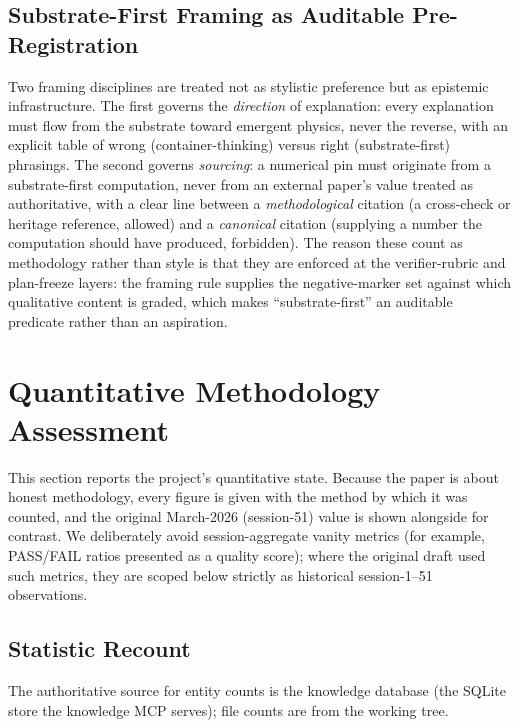 \documentclass[12pt,a4paper]{article}
\begin{document}
\subsection{Substrate-First Framing as Auditable Pre-Registration}
\label{sec:floor-framing}

Two framing disciplines are treated not as stylistic preference but as epistemic infrastructure. The first governs the \emph{direction} of explanation: every explanation must flow from the substrate toward emergent physics, never the reverse, with an explicit table of wrong (container-thinking) versus right (substrate-first) phrasings. The second governs \emph{sourcing}: a numerical pin must originate from a substrate-first computation, never from an external paper's value treated as authoritative, with a clear line between a \emph{methodological} citation (a cross-check or heritage reference, allowed) and a \emph{canonical} citation (supplying a number the computation should have produced, forbidden). The reason these count as methodology rather than style is that they are enforced at the verifier-rubric and plan-freeze layers: the framing rule supplies the negative-marker set against which qualitative content is graded, which makes ``substrate-first'' an auditable predicate rather than an aspiration.

\section{Quantitative Methodology Assessment}
\label{sec:assessment}

This section reports the project's quantitative state. Because the paper is about honest methodology, every figure is given with the method by which it was counted, and the original March-2026 (session-51) value is shown alongside for contrast. We deliberately avoid session-aggregate vanity metrics (for example, PASS/FAIL ratios presented as a quality score); where the original draft used such metrics, they are scoped below strictly as historical session-1--51 observations.

\subsection{Statistic Recount}
\label{sec:recount}

The authoritative source for entity counts is the knowledge database (the SQLite store the knowledge MCP serves); file counts are from the working tree.
\end{document}
